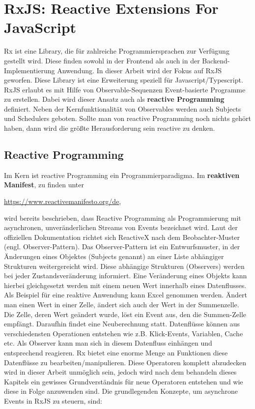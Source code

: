 \section{RxJS: Reactive Extensions For JavaScript}

Rx ist eine Library, die für zahlreiche Programmiersprachen zur Verfügung gestellt wird. Diese finden sowohl in der Frontend als auch in der Backend-Implementierung Anwendung. In dieser Arbeit wird der Fokus auf RxJS geworfen. Diese Library ist eine Erweiterung speziell für Javascript/Typescript. RxJS erlaubt es mit Hilfe von Observable-Sequenzen Event-basierte Programme zu erstellen. Dabei wird dieser Ansatz auch als \textbf{reactive Programming} definiert. Neben der Kernfunktionalität von Observables werden auch Subjects und Schedulers geboten. Sollte man von reactive Programming noch nichts gehört haben, dann wird die größte Herausforderung sein \glqq{}reactive\grqq{} zu denken.

\subsection{Reactive Programming}
Im Kern ist reactive Programming ein Programmierparadigma. Im \textbf{reaktiven Manifest}, zu finden unter

\begin{center}
\url{https://www.reactivemanifesto.org/de},
\end{center}

\noindent
wird bereits beschrieben, dass Reactive Programming als Programmierung mit asynchronen, unveränderlichen Streams von Events bezeichnet wird. Laut der offiziellen Dokumentation richtet sich ReactiveX nach dem Beobachter-Muster (engl. Observer-Pattern). Das Observer-Pattern ist ein Entwurfsmuster, in der Änderungen eines Objektes (Subjects genannt) an einer Liste abhängiger Strukturen weitergereicht wird. Diese abhängige Strukturen (Observers) werden bei jeder Zustandsveränderung informiert. Eine Veränderung eines Objekts kann hierbei gleichgesetzt werden mit einem neuen Wert innerhalb eines Datenflusses. Als Beispiel für eine reaktive Anwendung kann Excel genommen werden. Ändert man einen Wert in einer Zelle, ändert sich auch der Wert in der Summenzelle. Die Zelle, deren Wert geändert wurde, löst ein Event aus, den die Summen-Zelle empfängt. Daraufhin findet eine Neuberechnung statt\cite{reactive-programming-beispiel}. Datenflüsse können aus verschiedensten Operationen entstehen wie z.B. Klick-Events, Variablen, Cache etc. Als Observer kann man sich in diesem Datenfluss einhängen und entsprechend reagieren\cite{rx-intro}. Rx bietet eine enorme Menge an Funktionen diese Datenflüsse zu bearbeiten/manipulieren. Diese Operatoren komplett abzudecken wird in dieser Arbeit unmöglich sein, jedoch wird nach dem behandeln dieses Kapitels ein gewisses Grundverständnis für neue Operatoren entstehen und wie diese in Folge anzuwenden sind. Die grundlegenden Konzepte, um asynchrone Events in RxJS zu steuern, sind:

